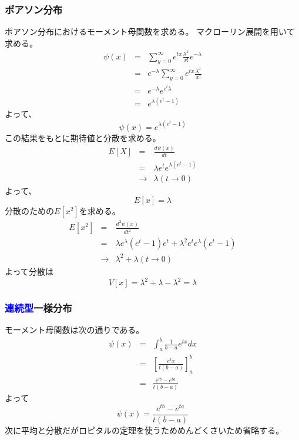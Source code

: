 \documentclass[a4paper,10pt]{jarticle}
\begin{document}
\subsubsection{ポアソン分布}
ポアソン分布におけるモーメント母関数を求める。
マクローリン展開を用いて求める。
\begin{eqnarray*}
    \psi(x) &=& \sum_{y=0}^\infty e^{tx}\frac{\lambda^x}{x!}e^{-\lambda}\\
    &=& e^{-\lambda}\sum_{y=0}^\infty e^{tx}\frac{\lambda^x}{x!}\\
    &=& e^{-\lambda} e^{e^t\lambda}\\
    &=& e^{\lambda(e^t-1)}
\end{eqnarray*}
よって、
\begin{equation}
    \psi(x) = e^{\lambda(e^t-1)}\tag{3,43}
\end{equation}
この結果をもとに期待値と分散を求める。
\begin{eqnarray*}
    E[X] &=& \frac{d\psi(x)}{dt}\\
    &=&  \lambda e^t e^{\lambda(e^t-1)}\\
    &\rightarrow& \lambda(t\rightarrow 0)
\end{eqnarray*}
よって、
\begin{equation}
    E[x] = \lambda \tag{3,44}
\end{equation}
分散のための$E[x^2]$を求める。
\begin{eqnarray*}
    E[x^2] &=& \frac{d^2\psi(x)}{dt^2}\\
        &=& \lambda e^\lambda(e^t-1)e^t + \lambda^2e^te^\lambda(e^t-1)\\
        &\rightarrow& \lambda^2 + \lambda (t\rightarrow 0)
\end{eqnarray*}
よって分散は
\begin{equation}
    V[x]=\lambda^2+\lambda -\lambda^2 =\lambda \tag{3,45}
\end{equation}
\subsubsection{\textcolor{blue}{連続型}一様分布}

モーメント母関数は次の通りである。
\begin{eqnarray*}
    \psi(x) &=& \int_a^b \frac{1}{b-a}e^{tx}dx\\
    &=& \left[\frac{e^tx}{t(b-a)}\right]_a^b\\
    &=& \frac{e^{tb}-e^{ta}}{t(b-a)}
\end{eqnarray*}
よって
\begin{equation}
    \psi(x) = \frac{e^{tb}-e^{ta}}{t(b-a)}\tag{3,46}
\end{equation}
次に平均と分散だがロピタルの定理を使うためめんどくさいため省略する。
\end{document}
